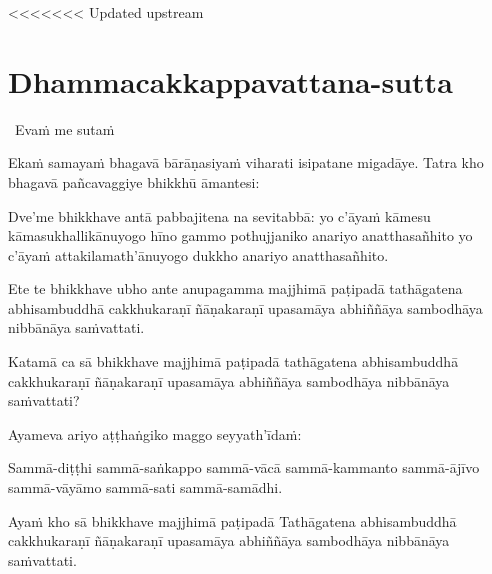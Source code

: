 <<<<<<< Updated upstream
\section{Dhammacakkappavattana-sutta}
\label{dhammacakkappavattana-full}

\begin{leader}
  \anglebracketleft\ \hspace{-0.5mm}Evaṁ me sutaṁ \hspace{-0.5mm}\anglebracketright\
\end{leader}

\begin{pali-hang}
  Ekaṁ samayaṁ bhagavā bārāṇasiyaṁ viharati isipatane migadāye. Tatra kho bhagavā pañcavaggiye bhikkhū āmantesi:
\end{pali-hang}

\begin{pali-hang}
  Dve'me bhikkhave antā pabbajitena na sevitabbā: yo c'āyaṁ kāmesu kāmasukhallikānuyogo hīno gammo pothujjaniko anariyo anatthasañhito yo c'āyaṁ attakilamath'ānuyogo dukkho anariyo anatthasañhito.
\end{pali-hang}

\begin{pali-hang}
  Ete te bhikkhave ubho ante anupagamma majjhimā paṭipadā tathāgatena abhisambuddhā cakkhukaraṇī ñāṇakaraṇī upasamāya abhiññāya sambodhāya nibbānāya saṁvattati.
\end{pali-hang}

\begin{pali-hang}
  Katamā ca sā bhikkhave majjhimā paṭipadā tathāgatena abhisambuddhā cakkhukaraṇī ñāṇakaraṇī upasamāya abhiññāya sambodhāya nibbānāya saṁvattati?
\end{pali-hang}

\begin{pali-hang}
  Ayameva ariyo aṭṭhaṅgiko maggo seyyath'īdaṁ:
\end{pali-hang}

\begin{pali-hang}
  Sammā-diṭṭhi sammā-saṅkappo sammā-vācā sammā-kammanto sammā-ājīvo sammā-vāyāmo sammā-sati sammā-samādhi.
\end{pali-hang}

\begin{pali-hang}
  Ayaṁ kho sā bhikkhave majjhimā paṭipadā Tathāgatena abhisambuddhā cakkhukaraṇī ñāṇakaraṇī upasamāya abhiññāya sambodhāya nibbānāya saṁvattati.
\end{pali-hang}

